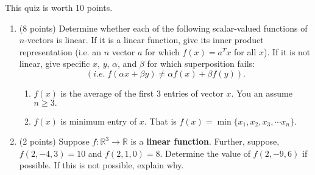 \documentclass[11pt,fleqn]{article}
\begin{document}
\renewcommand{\headrulewidth}{0pt}
\newcommand{\blank}[1]{\rule{#1}{0.75pt}}
\renewcommand{\d}{\displaystyle}
This quiz is worth 10 points.
\begin{enumerate}
\item (8 points) Determine whether each of the following scalar-valued functions of $n$-vectors is linear. If it is a linear function, give its inner product representation (i.e. an $n$ vector $a$ for which $f(x)=a^Tx$ for all $x$). If it is not linear, give specific $x$, $y$, $\alpha$, and $\beta$ for which superposition fails: $$( i.e. \; f(\alpha x + \beta y) \not = \alpha f(x) + \beta f(y)).$$
\begin{enumerate}
\item $f(x)$ is the average of the first 3 entries of vector $x.$ You an assume $n\geq 3.$

\vfill

\item $f(x)$ is minimum entry of $x$. That is $f(x)= \min \{x_1,x_2,x_3, \cdots x_n\}.$

\vfill
\end{enumerate}

\item (2 points) Suppose $f: \mathbb{R}^3 \to \mathbb{R}$ is a \textbf{linear function}. Further, suppose, $f(2,-4,3)=10$ and $f(2,1,0)=8.$ Determine the value of $f(2,-9,6)$ if possible. If this is not possible, explain why.
\vspace{3in}
\end{enumerate}
\end{document}
